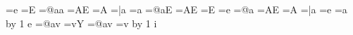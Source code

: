 {      \else
       \ifcase\thisfvs
        \t@kenbuffer=\expandafter{\the\t@kenbuffer e}%
       \or
        \t@kenbuffer=\expandafter{\the\t@kenbuffer E}%
       \fi
      \fi
     \fi
    \fi
   \else%
    \ifpreviousisboundary%
     \t@kenbuffer=\expandafter{\the\t@kenbuffer @aa}%
    \else%
     \ifpreviousisround %
      \iffollowingispseudoboundary %
       \t@kenbuffer=\expandafter{\the\t@kenbuffer AE}%
      \else%
       \t@kenbuffer=\expandafter{\the\t@kenbuffer A}%
      \fi
     \else%
      \ifpreviousispseudoboundary %
       \t@kenbuffer=\expandafter{\the\t@kenbuffer |a}%
      \else%
       \t@kenbuffer=\expandafter{\the\t@kenbuffer a}%
      \fi
     \fi
    \fi
   \fi%
  \else \if\thischar \a@mlaut%
   \iffollowingisboundary%
    \ifpreviousisboundary%
     \t@kenbuffer=\expandafter{\the\t@kenbuffer @aE}%
    \else     %
     \ifpreviousisround
      \t@kenbuffer=\expandafter{\the\t@kenbuffer AE}%
     \else%
      \ifpreviousispseudoboundary
       \t@kenbuffer=\expandafter{\the\t@kenbuffer E}%
      \else%
       \t@kenbuffer=\expandafter{\the\t@kenbuffer e}%
      \fi
     \fi
    \fi
   \else
    \ifpreviousisboundary%
     \t@kenbuffer=\expandafter{\the\t@kenbuffer @a}%
    \else%
     \ifpreviousisround
      \iffollowingispseudoboundary
       \t@kenbuffer=\expandafter{\the\t@kenbuffer AE}%
      \else
       \t@kenbuffer=\expandafter{\the\t@kenbuffer A}%
      \fi
     \else%
      \ifpreviousispseudoboundary
       \t@kenbuffer=\expandafter{\the\t@kenbuffer |a}%
      \else%
       \iffollowingispseudoboundary
        \t@kenbuffer=\expandafter{\the\t@kenbuffer e}%
       \else
        \t@kenbuffer=\expandafter{\the\t@kenbuffer a}%
       \fi
      \fi
     \fi
    \fi
   \fi
   \advance\syllablecount by 1
  \else \if\thischar e%
   \iffollowingisboundary%
    \ifpreviousisboundary%
     \t@kenbuffer=\expandafter{\the\t@kenbuffer @av}%
    \else%
     \t@kenbuffer=\expandafter{\the\t@kenbuffer vY}%
    \fi%
   \else%
    \ifpreviousisboundary%
     \t@kenbuffer=\expandafter{\the\t@kenbuffer @av}%
    \else%
     \t@kenbuffer=\expandafter{\the\t@kenbuffer v}%
    \fi
   \fi
   \advance\syllablecount by 1
  \else \if\thischar i%
   \iffollowingisboundary%
}
